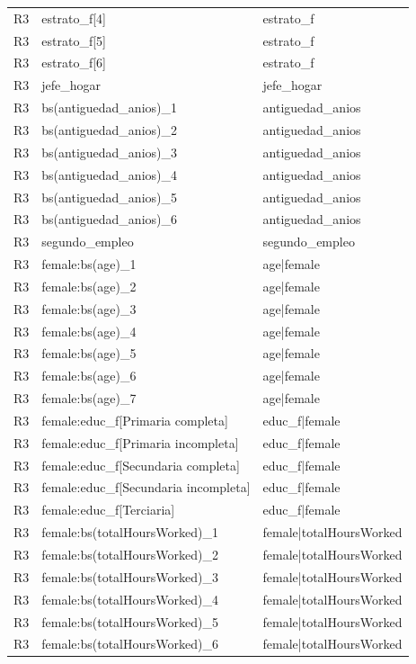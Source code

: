 \begin{longtable}{lll}
R3 & estrato\_f[4] & estrato\_f \\
R3 & estrato\_f[5] & estrato\_f \\
R3 & estrato\_f[6] & estrato\_f \\
R3 & jefe\_hogar & jefe\_hogar \\
R3 & bs(antiguedad\_anios)\_1 & antiguedad\_anios \\
R3 & bs(antiguedad\_anios)\_2 & antiguedad\_anios \\
R3 & bs(antiguedad\_anios)\_3 & antiguedad\_anios \\
R3 & bs(antiguedad\_anios)\_4 & antiguedad\_anios \\
R3 & bs(antiguedad\_anios)\_5 & antiguedad\_anios \\
R3 & bs(antiguedad\_anios)\_6 & antiguedad\_anios \\
R3 & segundo\_empleo & segundo\_empleo \\
R3 & female:bs(age)\_1 & age|female \\
R3 & female:bs(age)\_2 & age|female \\
R3 & female:bs(age)\_3 & age|female \\
R3 & female:bs(age)\_4 & age|female \\
R3 & female:bs(age)\_5 & age|female \\
R3 & female:bs(age)\_6 & age|female \\
R3 & female:bs(age)\_7 & age|female \\
R3 & female:educ\_f[Primaria completa] & educ\_f|female \\
R3 & female:educ\_f[Primaria incompleta] & educ\_f|female \\
R3 & female:educ\_f[Secundaria completa] & educ\_f|female \\
R3 & female:educ\_f[Secundaria incompleta] & educ\_f|female \\
R3 & female:educ\_f[Terciaria] & educ\_f|female \\
R3 & female:bs(totalHoursWorked)\_1 & female|totalHoursWorked \\
R3 & female:bs(totalHoursWorked)\_2 & female|totalHoursWorked \\
R3 & female:bs(totalHoursWorked)\_3 & female|totalHoursWorked \\
R3 & female:bs(totalHoursWorked)\_4 & female|totalHoursWorked \\
R3 & female:bs(totalHoursWorked)\_5 & female|totalHoursWorked \\
R3 & female:bs(totalHoursWorked)\_6 & female|totalHoursWorked \\

\end{longtable}
